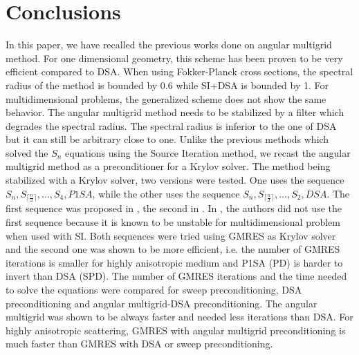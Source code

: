 \section{Conclusions}
In this paper, we have recalled the previous works done on angular multigrid
method. For one dimensional geometry, this scheme has been proven to be very 
efficient compared to DSA. When using Fokker-Planck cross sections, the
spectral radius of the method is bounded by 0.6 while SI+DSA is bounded by 1. 
For multidimensional problems, the generalized scheme does
not show the same behavior. The angular multigrid method needs to be
stabilized
by a filter which degrades the spectral radius. The spectral radius is inferior 
to the one of DSA but it can still be arbitrary close to one. 
Unlike the previous methods which solved the $S_n$ equations using the Source 
Iteration method, we recast the angular multigrid method as a preconditioner 
for a Krylov solver. The method being stabilized with a Krylov solver, two 
versions were tested. One uses the sequence $S_n,S_{\lceil\frac{n}{2}\rceil},
\hdots,S_4,P1SA$, while the other uses the sequence $S_n,
S_{\lceil\frac{n}{2}\rceil},\hdots,S_2,DSA$.
The first sequence was proposed in \cite{multigrid_1d}, the second in 
\cite{multigrid_2d}. In \cite{multigrid_2d}, the authors did not use the first
sequence because it is known to be unstable for multidimensional problem when 
used with SI. Both sequences were tried using GMRES as Krylov solver and the 
second one was shown to be more 
efficient, i.e. the number of GMRES iterations is smaller for highly 
anisotropic medium and P1SA (PD) is harder to invert than
DSA (SPD). The number of GMRES iterations and the time needed
to solve the equations were compared for sweep preconditioning, DSA
preconditioning and angular multigrid-DSA preconditioning. The angular
multigrid was shown to be always faster and needed less iterations than DSA.
For highly anisotropic scattering, GMRES with angular multigrid
preconditioning is much faster than GMRES with DSA or sweep preconditioning.
